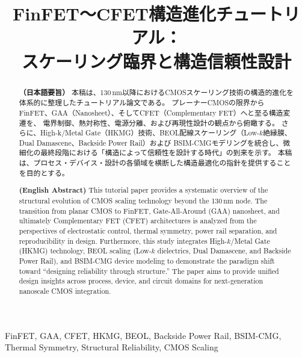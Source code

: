 \documentclass[conference]{IEEEtran}
\title{FinFET〜CFET構造進化チュートリアル：\\
スケーリング臨界と構造信頼性設計}
\author{%
  \IEEEauthorblockN{三溝 真一 (Shinichi Samizo)}%
  \IEEEauthorblockA{独立系半導体研究者（元セイコーエプソン） / Independent Semiconductor Researcher (ex-Seiko Epson)\\%
  Email: \href{mailto:shin3t72@gmail.com}{shin3t72@gmail.com}\quad
  GitHub: \url{https://github.com/Samizo-AITL}}%
}
\begin{document}
\maketitle

\begin{abstract}
\textbf{（日本語要旨）}  
本稿は、130\,nm以降におけるCMOSスケーリング技術の構造的進化を体系的に整理したチュートリアル論文である。  
プレーナーCMOSの限界からFinFET、GAA（Nanosheet）、そしてCFET（Complementary FET）へと至る構造変遷を、  
電界制御、熱対称性、電源分離、および再現性設計の観点から俯瞰する。  
さらに、High-k/Metal Gate（HKMG）技術、BEOL配線スケーリング（Low-$k$絶縁膜、Dual Damascene、Backside Power Rail）および  
BSIM-CMGモデリングを統合し、微細化の最終段階における「構造によって信頼性を設計する時代」の到来を示す。  
本稿は、プロセス・デバイス・設計の各領域を横断した構造最適化の指針を提供することを目的とする。  

\medskip
\textbf{(English Abstract)}  
This tutorial paper provides a systematic overview of the structural evolution of CMOS scaling technology beyond the 130\,nm node.  
The transition from planar CMOS to FinFET, Gate-All-Around (GAA) nanosheet, and ultimately Complementary FET (CFET) architectures  
is analyzed from the perspectives of electrostatic control, thermal symmetry, power rail separation, and reproducibility in design.  
Furthermore, this study integrates High-$k$/Metal Gate (HKMG) technology, BEOL scaling (Low-$k$ dielectrics, Dual Damascene,  
and Backside Power Rail), and BSIM-CMG device modeling to demonstrate the paradigm shift toward “designing reliability through structure.”  
The paper aims to provide unified design insights across process, device, and circuit domains for next-generation nanoscale CMOS integration.
\end{abstract}

\begin{IEEEkeywords}
FinFET, GAA, CFET, HKMG, BEOL, Backside Power Rail, BSIM-CMG, Thermal Symmetry, Structural Reliability, CMOS Scaling
\end{IEEEkeywords}












\end{document}
